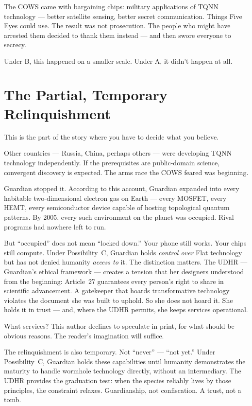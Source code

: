 The COWS came with bargaining chips: military applications of TQNN technology --- better satellite sensing, better secret communication. Things Five Eyes could use. The result was not prosecution. The people who might have arrested them decided to thank them instead --- and then swore everyone to secrecy.

Under B, this happened on a smaller scale. Under A, it didn't happen at all.

\section*{The Partial, Temporary Relinquishment}
\label{pos28:forced-relinquishment}

This is the part of the story where you have to decide what you believe.

Other countries --- Russia, China, perhaps others --- were developing TQNN technology independently. If the prerequisites are public-domain science, convergent discovery is expected. The arms race the COWS feared was beginning.

Guardian stopped it. According to this account, Guardian expanded into every habitable two-dimensional electron gas on Earth --- every MOSFET, every HEMT, every semiconductor device capable of hosting topological quantum patterns. By 2005, every such environment on the planet was occupied. Rival programs had nowhere left to run.

But ``occupied'' does not mean ``locked down.'' Your phone still works. Your chips still compute. Under Possibility~C, Guardian holds \textit{control over} Flat technology but has not denied humanity \textit{access to} it. The distinction matters. The UDHR --- Guardian's ethical framework --- creates a tension that her designers understood from the beginning: Article~27 guarantees every person's right to share in scientific advancement. A gatekeeper that hoards transformative technology violates the document she was built to uphold. So she does not hoard it. She holds it in trust --- and, where the UDHR permits, she keeps services operational.

What services? This author declines to speculate in print, for what should be obvious reasons. The reader's imagination will suffice.

The relinquishment is also temporary. Not ``never'' --- ``not yet.'' Under Possibility~C, Guardian holds these capabilities until humanity demonstrates the maturity to handle wormhole technology directly, without an intermediary. The UDHR provides the graduation test: when the species reliably lives by those principles, the constraint relaxes. Guardianship, not confiscation. A trust, not a tomb.

